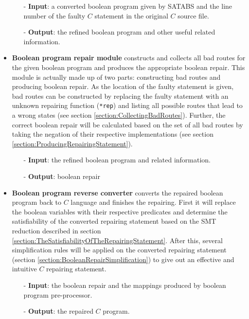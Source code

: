 \documentclass[10pt,journal,final,]{article}
\theoremstyle{definition}
\begin{document}
\begin{itemize}
\begin{itemize}
\item[-] \textbf{Input}: a converted boolean program given by SATABS and the line number of the faulty $C$ statement in the original $C$ source file.
\item[-] \textbf{Output}: the refined boolean program and other useful related information.
\end{itemize}

\item \textbf{Boolean program repair module} constructs and collects all bad routes for the given boolean program and produces the appropriate boolean repair.
This module is actually made up of two parts: constructing bad routes and producing boolean repair.
As the location of the faulty statement is given, bad routes can be constructed by replacing the faulty statement with an unknown repairing function (\lstinline|*rep|) and listing all possible routes that lead to a wrong states (see section \ref{section:CollectingBadRoutes}).
Further, the correct boolean repair will be calculated based on the set of all bad routes by taking the negation of their respective implementations (see section \ref{section:ProducingRepairingStatement}).

\begin{itemize}
\item[-] \textbf{Input}: the refined boolean program and related information.
\item[-] \textbf{Output}: boolean repair
\end{itemize}

\item \textbf{Boolean program reverse converter} converts the repaired boolean program back to $C$ language and finishes the repairing. First it will replace the boolean variables with their respective predicates
and determine the satisfiability of the converted repairing statement based on the SMT reduction described in section \ref{section:TheSatisfiabilityOfTheRepairingStatement}.
After this, several simplification rules will be applied on the converted repairing statement (section \ref{section:BooleanRepairSimplification}) to give out an effective and intuitive $C$ repairing statement.

\begin{itemize}
\item[-] \textbf{Input}: the boolean repair and the mappings produced by boolean program pre-processor.
\item[-] \textbf{Output}: the repaired $C$ program.
\end{itemize}

\end{itemize}
\end{document}
